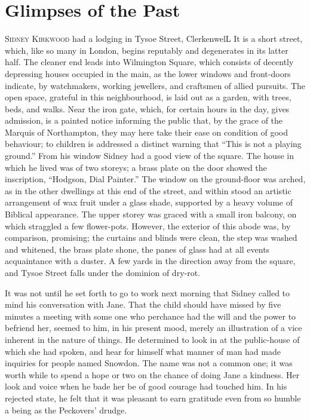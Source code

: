 \chapter{Glimpses of the Past}

\textsc{Sidney Kirkwood} had a lodging in Tysoe Street, ClerkenwelL It
is a short street, which, like so many in London, begins reputably and
degenerates in its latter half. The cleaner end leads into Wilmington
Square, which consists of decently depressing houses occupied in the
main, as the lower windows and front-doors indicate, by watchmakers,
working jewellers, and craftsmen of allied pursuits. The open space,
grateful in this neighbourhood, is laid out as a garden, with trees,
beds, and walks. Near the iron gate, which, for certain hours in the
day, gives admission, is a painted notice informing the public that, by
the grace of the Marquis of Northampton, they may here take their ease
on condition of good behaviour; to children {}is addressed a distinct
warning that ``This is not a playing ground.'' From his window Sidney
had a good view of the square. The house in which he lived was of two
storeys; a brass plate on the door showed the inscription, ``Hodgson,
Dial Painter.'' The window on the ground-floor was arched, as in the
other dwellings at this end of the street, and within stood an artistic
arrangement of wax fruit under a glass shade, supported by a heavy
volume of Biblical appearance. The upper storey was graced with a small
iron balcony, on which straggled a few flower-pots. However, the
exterior of this abode was, by comparison, promising; the curtains and
blinds were clean, the step was washed and whitened, the brass plate
shone, the panes of glass had at all events acquaintance with a duster.
A few yards in the direction away from the square, and Tysoe Street
falls under the dominion of dry-rot.

It was not until he set forth to go to work next morning that Sidney
called to mind his conversation with Jane. That the child should {}have
missed by five minutes a meeting with some one who perchance had the
will and the power to befriend her, seemed to him, in his present mood,
merely an illustration of a vice inherent in the nature of things. He
determined to look in at the public-house of which she had spoken, and
hear for himself what manner of man had made inquiries for people named
Snowdon. The name was not a common one; it was worth while to spend a
hope or two on the chance of doing Jane a kindness. Her look and voice
when he bade her be of good courage had touched him. In his rejected
state, he felt that it was pleasant to earn gratitude even from so
humble a being as the Peckovers' drudge.

